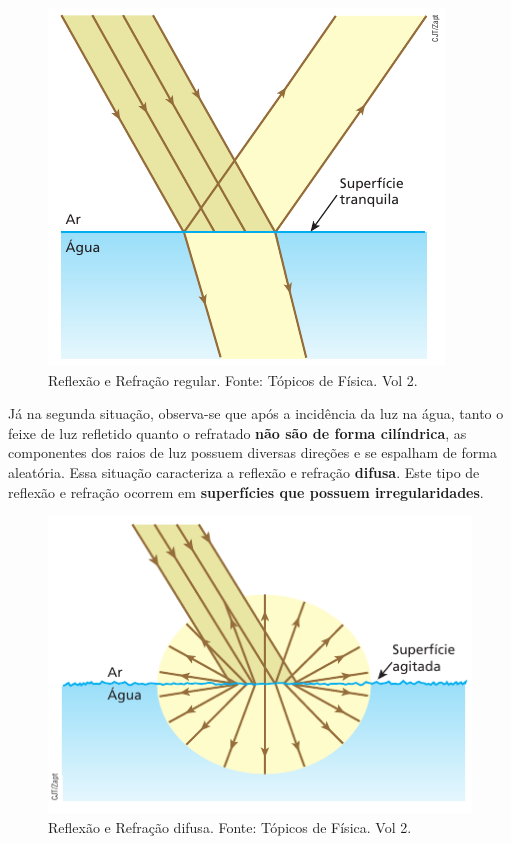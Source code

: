 \documentclass[11pt,twocolumn,oneside]{article}
\begin{document}
\begin{figure}[h]{}
\centering\includegraphics[width=2.5truein]{img8.png}
\caption{Reflexão e Refração regular. Fonte: Tópicos de Física. Vol 2.}
\centering
\end{figure}

Já na segunda situação, observa-se que após a incidência da luz na água, tanto o feixe de luz refletido quanto o refratado \textbf{não são de forma cilíndrica}, as componentes dos raios de luz possuem diversas direções e se espalham de forma aleatória. Essa situação caracteriza a reflexão e refração \textbf{difusa}. Este tipo de reflexão e refração ocorrem em \textbf{superfícies que possuem irregularidades}.


\begin{figure}[h]{}
\centering\includegraphics[width=2.5truein]{img9.png}
\caption{Reflexão e Refração difusa. Fonte: Tópicos de Física. Vol 2.}
\centering
\end{figure}
\end{document}
